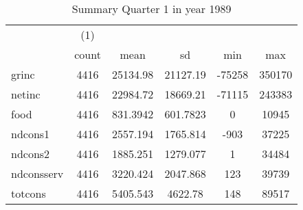 \begin{table}[htbp]\centering
\def\sym#1{\ifmmode^{#1}\else\(^{#1}\)\fi}
\caption{Summary Quarter 1 in year 1989 \label{sum\_Q1\_y1989}}
\begin{tabular}{l*{1}{ccccc}}
\hline\hline
            &\multicolumn{1}{c}{(1)}&            &            &            &            \\
            &       count&        mean&          sd&         min&         max\\
\hline
grinc       &        4416&    25134.98&    21127.19&      -75258&      350170\\
netinc      &        4416&    22984.72&    18669.21&      -71115&      243383\\
food        &        4416&    831.3942&    601.7823&           0&       10945\\
ndcons1     &        4416&    2557.194&    1765.814&        -903&       37225\\
ndcons2     &        4416&    1885.251&    1279.077&           1&       34484\\
ndconsserv  &        4416&    3220.424&    2047.868&         123&       39739\\
totcons     &        4416&    5405.543&     4622.78&         148&       89517\\
\hline\hline
\end{tabular}
\end{table}
